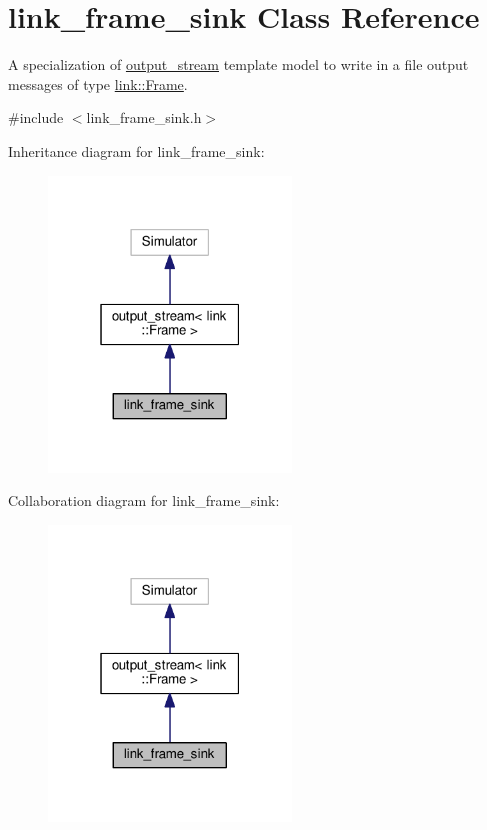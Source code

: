 \hypertarget{classlink__frame__sink}{}\section{link\+\_\+frame\+\_\+sink Class Reference}
\label{classlink__frame__sink}


A specialization of \hyperlink{classoutput__stream}{output\+\_\+stream} template model to write in a file output messages of type \hyperlink{structlink_1_1Frame}{link\+::\+Frame}.  




{\ttfamily \#include $<$link\+\_\+frame\+\_\+sink.\+h$>$}



Inheritance diagram for link\+\_\+frame\+\_\+sink\+:\nopagebreak
\begin{figure}[H]
\begin{center}
\leavevmode
\includegraphics[width=183pt]{classlink__frame__sink__inherit__graph}
\end{center}
\end{figure}


Collaboration diagram for link\+\_\+frame\+\_\+sink\+:\nopagebreak
\begin{figure}[H]
\begin{center}
\leavevmode
\includegraphics[width=183pt]{classlink__frame__sink__coll__graph}
\end{center}
\end{figure}
